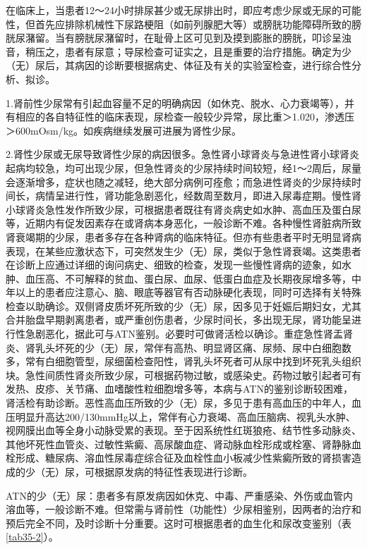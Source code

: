在临床上，当患者12～24小时排尿甚少或无尿排出时，即应考虑少尿或无尿的可能性，但首先应排除机械性下尿路梗阻（如前列腺肥大等）或膀胱功能障碍所致的膀胱尿潴留。当有膀胱尿潴留时，在耻骨上区可见到及摸到膨胀的膀胱，叩诊呈浊音，稍压之，患者有尿意；导尿检查可证实之，且是重要的治疗措施。确定为少（无）尿后，其病因的诊断要根据病史、体征及有关的实验室检查，进行综合性分析、拟诊。

1.肾前性少尿常有引起血容量不足的明确病因（如休克、脱水、心力衰竭等），并有相应的各自特征性的临床表现，尿检查一般较少异常，尿比重＞1.020，渗透压＞600mOsm/kg。如疾病继续发展可进展为肾性少尿。

2.肾性少尿或无尿导致肾性少尿的病因很多。急性肾小球肾炎与急进性肾小球肾炎起病均较急，均可出现少尿，但急性肾炎的少尿持续时间较短，经1～2周后，尿量会逐渐增多，症状也随之减轻，绝大部分病例可痊愈；而急进性肾炎的少尿持续时间长，病情呈进行性，肾功能急剧恶化，经数周至数月，即进入尿毒症期。慢性肾小球肾炎急性发作所致少尿，可根据患者既往有肾炎病史如水肿、高血压及蛋白尿等，近期内有促发因素存在或肾病本身恶化，一般诊断不难。各种慢性肾脏病所致肾衰竭期的少尿，患者多存在各种肾病的临床特征。但亦有些患者平时无明显肾病表现，在某些应激状态下，可突然发生少（无）尿，类似于急性肾衰竭。这类患者在诊断上应通过详细的询问病史、细致的检查，发现一些慢性肾病的迹象，如水肿、血压高、不可解释的贫血、蛋白尿、血尿、低蛋白血症及长期夜尿增多等，中年以上的患者应注意心、脑、眼底等器官有否动脉硬化表现，同时可选择有关特殊检查以助确诊。双侧肾皮质坏死所致的少（无）尿，因多见于妊娠后期妇女，尤其合并胎盘早期剥离患者，或严重创伤患者，少尿时间长，多出现无尿，肾功能呈进行性急剧恶化，据此可与ATN鉴别。必要时可做肾活检以确诊。重症急性肾盂肾炎、肾乳头坏死的少（无）尿，常伴有高热、明显肾区痛、尿频、尿中白细胞数多，常有白细胞管型，尿细菌检查阳性，肾乳头坏死者可从尿中找到坏死乳头组织块。急性间质性肾炎所致少尿，可根据药物过敏，或感染史。药物过敏引起者可有发热、皮疹、关节痛、血嗜酸性粒细胞增多等，本病与ATN的鉴别诊断较困难，肾活检有助诊断。恶性高血压所致的少（无）尿，多见于患有高血压的中年人，血压明显升高达200/130mmHg以上，常伴有心力衰竭、高血压脑病、视乳头水肿、视网膜出血等全身小动脉受累的表现。至于因系统性红斑狼疮、结节性多动脉炎、其他坏死性血管炎、过敏性紫癜、高尿酸血症、肾动脉血栓形成或栓塞、肾静脉血栓形成、糖尿病、溶血性尿毒症综合征及血栓性血小板减少性紫癜所致的肾损害造成的少（无）尿，可根据原发病的特征性表现进行诊断。

ATN的少（无）尿：患者多有原发病因如休克、中毒、严重感染、外伤或血管内溶血等，一般诊断不难。但常需与肾前性（功能性）少尿相鉴别，因两者的治疗和预后完全不同，及时诊断十分重要。这时可根据患者的血生化和尿改变鉴别（表\ref{tab35-2}）。

